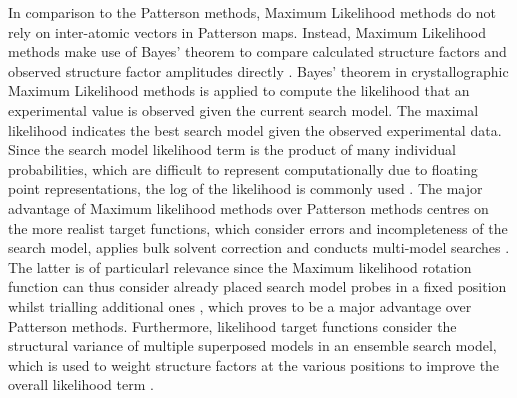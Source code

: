 In comparison to the Patterson methods, Maximum Likelihood methods do not rely on inter-atomic vectors in Patterson maps. Instead, Maximum Likelihood methods make use of Bayes' theorem \cite{Bayes1763-ox} to compare calculated structure factors and observed structure factor amplitudes directly \cite{Read2001-nu}. Bayes' theorem in crystallographic Maximum Likelihood methods is applied to compute the likelihood that an experimental value is observed given the current search model. The maximal likelihood indicates the best search model given the observed experimental data. Since the search model likelihood term is the product of many individual probabilities, which are difficult to represent computationally due to floating point representations, the log of the likelihood is commonly used \cite{Rupp2010-nc}. The major advantage of Maximum likelihood methods over Patterson methods centres on the more realist target functions, which consider errors and incompleteness of the search model, applies bulk solvent correction and conducts multi-model searches \cite{Read2001-nu}. The latter is of particularl relevance since the Maximum likelihood rotation function can thus consider already placed search model probes in a fixed position whilst trialling additional ones \cite{Storoni2004-ed}, which proves to be a major advantage over Patterson methods.  Furthermore, likelihood target functions consider the structural variance of multiple superposed models in an ensemble search model, which is used to weight structure factors at the various positions to improve the overall likelihood term \cite{Read2001-nu}. 

